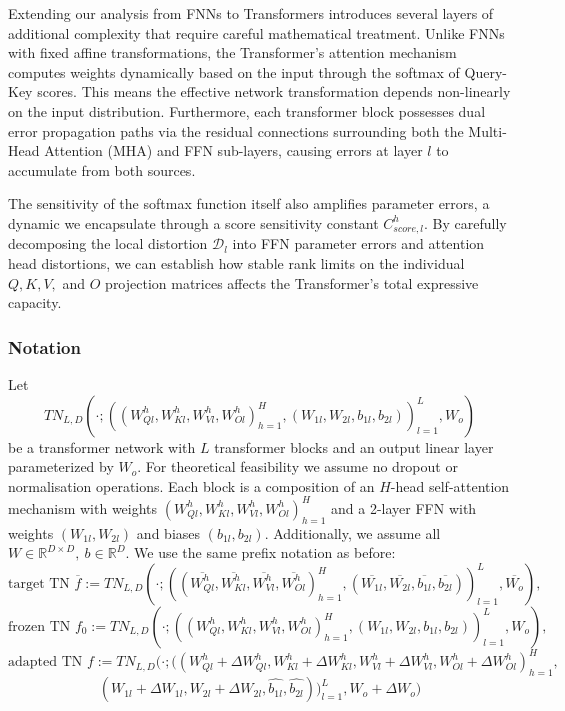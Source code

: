 \documentclass[a4paper,14pt]{extarticle}
\begin{document}
    Extending our analysis from FNNs to Transformers introduces several layers of additional complexity that require careful mathematical treatment. Unlike FNNs with fixed affine transformations, the Transformer's attention mechanism computes weights dynamically based on the input through the softmax of Query-Key scores. This means the effective network transformation depends non-linearly on the input distribution. Furthermore, each transformer block possesses dual error propagation paths via the residual connections surrounding both the Multi-Head Attention (MHA) and FFN sub-layers, causing errors at layer $l$ to accumulate from both sources. 

    The sensitivity of the softmax function itself also amplifies parameter errors, a dynamic we encapsulate through a score sensitivity constant $C_{score,l}^h$. By carefully decomposing the local distortion $\mathcal{D}_l$ into FFN parameter errors and attention head distortions, we can establish how stable rank limits on the individual $Q, K, V,$ and $O$ projection matrices affects the Transformer's total expressive capacity.


    \subsubsection{Notation}
    
    Let
    $$TN_{L,D}(\cdot;((W_{Ql}^h, W_{Kl}^h, W_{Vl}^h, W_{Ol}^h)_{h=1}^H, (W_{1l}, W_{2l}, b_{1l}, b_{2l}))_{l=1}^L, W_o)$$
    be a transformer network with $L$ transformer blocks and an output linear layer parameterized by $W_o$. For theoretical feasibility we assume no dropout or normalisation operations. Each block is a composition of an $H$-head self-attention mechanism \cite{vaswani2023attentionneed} with weights $(W_{Ql}^h, W_{Kl}^h, W_{Vl}^h, W_{Ol}^h)_{h=1}^H$ and a 2-layer FFN with weights $(W_{1l}, W_{2l})$ and biases $(b_{1l}, b_{2l})$. Additionally, we assume all $W\in\mathbb{R}^{D\times D}, ~b\in \mathbb{R}^D$.
    We use the same prefix notation as before:
    $$\text{target TN  } \overline{f} \!:= TN_{L,D}(\cdot;((\overline{W_{Ql}^h}, \overline{W_{Kl}^h}, \overline{W_{Vl}^h},\overline{W_{Ol}^h})_{h=1}^H,(\overline{W_{1l}}, \overline{W_{2l}}, \overline{b_{1l}}, \overline{b_{2l}}))_{l=1}^L,\overline{W_o}), $$ 
    $$\text{frozen TN } f_0 \!:= TN_{L,D}(\cdot;((W_{Ql}^h, W_{Kl}^h, W_{Vl}^h, W_{Ol}^h)_{h=1}^H, (W_{1l}, W_{2l}, b_{1l}, b_{2l}))_{l=1}^L, W_o),$$
    $$\text{adapted TN } f \!:= TN_{L,D}(\cdot;((W_{Ql}^h + \Delta W_{Ql}^h, W_{Kl}^h + \Delta W_{Kl}^h, W_{Vl}^h + \Delta W_{Vl}^h, W_{Ol}^h + \Delta W_{Ol}^h)_{h=1}^H, $$ 
    $$(W_{1l} + \Delta W_{1l}, W_{2l} + \Delta W_{2l}, \widehat{b_{1l}}, \widehat{b_{2l}}))_{l=1}^L, W_o + \Delta W_o)$$
    
\end{document}
